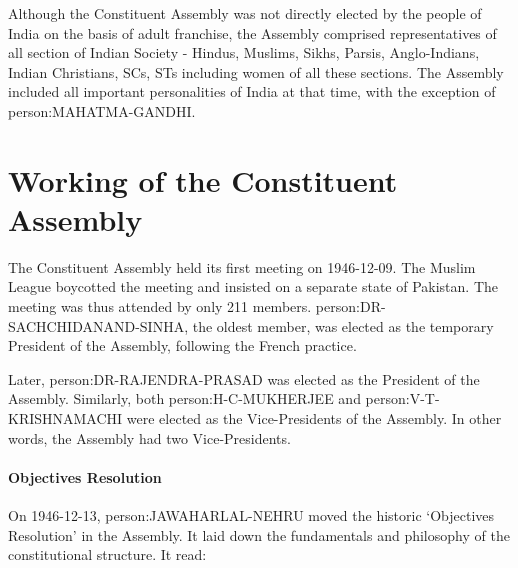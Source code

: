 Although the Constituent Assembly was not directly elected by the people of India on the basis of adult franchise, the Assembly comprised representatives of all section of Indian Society - Hindus, Muslims, Sikhs, Parsis, Anglo-Indians, Indian Christians, SCs, STs including women of all these sections. The Assembly included all important personalities of India at that time, with the exception of \gls{person:MAHATMA-GANDHI}.

\section{Working of the Constituent Assembly}

The Constituent Assembly held its first meeting on 1946-12-09. The Muslim League boycotted the meeting and insisted on a separate state of Pakistan. The meeting was thus attended by only 211 members. {\gls{person:DR-SACHCHIDANAND-SINHA}, the oldest member, was elected as the temporary President of the Assembly, following the French practice.}

Later, \gls{person:DR-RAJENDRA-PRASAD} was elected as the President of the Assembly. Similarly, both \gls{person:H-C-MUKHERJEE} and \gls{person:V-T-KRISHNAMACHI} were elected as the Vice-Presidents of the Assembly. In other words, the Assembly had two Vice-Presidents.

\paragraph{Objectives Resolution}

On 1946-12-13, \gls{person:JAWAHARLAL-NEHRU} moved the historic `Objectives Resolution' in the Assembly. It laid down the fundamentals and philosophy of the constitutional structure. It read:

